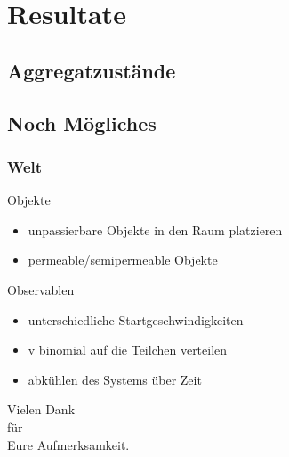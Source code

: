 \documentclass[11pt]{beamer}
\begin{document}
\begin{frame}
\end{frame}

\section{Resultate}

\subsection{Aggregatzustände} %



\subsection{Noch Mögliches} %

\begin{frame}
  \frametitle{Welt}
    \vspace*{-0.3cm}
  \begin{block}{Objekte}
    \begin{itemize} 
      \item unpassierbare Objekte in den Raum platzieren
      \item permeable/semipermeable Objekte
    \end{itemize}
  \end{block}
    \pause
  \begin{block}{Observablen}
    \begin{itemize} 
      \item unterschiedliche Startgeschwindigkeiten
      \item v binomial auf die Teilchen verteilen
      \item abkühlen des Systems über Zeit
    \end{itemize}
  \end{block}
\end{frame}

\begin{frame}
    \vspace*{0.9cm}
    \centering
    \Huge
    Vielen Dank\\
    für\\
    Eure Aufmerksamkeit.\\
\end{frame}
\end{document}
